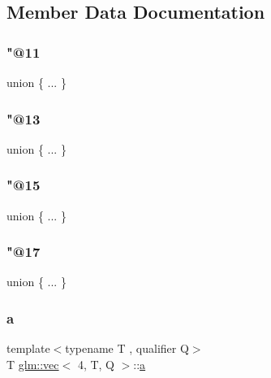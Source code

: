 \subsection{Member Data Documentation}
\mbox{\label{structglm_1_1vec_3_014_00_01_t_00_01_q_01_4_aa890ab635b49abc0ca73ec0a5d5b300d}} 
\subsubsection{\texorpdfstring{"@11}{@11}}
{\footnotesize\ttfamily union \{ ... \} }

\mbox{\label{structglm_1_1vec_3_014_00_01_t_00_01_q_01_4_aa4c6182cce44442db73c5fbd35786723}} 
\subsubsection{\texorpdfstring{"@13}{@13}}
{\footnotesize\ttfamily union \{ ... \} }

\mbox{\label{structglm_1_1vec_3_014_00_01_t_00_01_q_01_4_ace2b88b773cc3bf4381bfc9e8b793afb}} 
\subsubsection{\texorpdfstring{"@15}{@15}}
{\footnotesize\ttfamily union \{ ... \} }

\mbox{\label{structglm_1_1vec_3_014_00_01_t_00_01_q_01_4_afdc8bfb265955425d62d19e8056dd774}} 
\subsubsection{\texorpdfstring{"@17}{@17}}
{\footnotesize\ttfamily union \{ ... \} }

\mbox{\label{structglm_1_1vec_3_014_00_01_t_00_01_q_01_4_a2c591708237bac7d2047ff5af383a012}} 
\subsubsection{\texorpdfstring{a}{a}}
{\footnotesize\ttfamily template$<$typename T , qualifier Q$>$ \\
T \mbox{\hyperlink{structglm_1_1vec}{glm\+::vec}}$<$ 4, T, Q $>$\+::\mbox{\hyperlink{_s_d_l__opengl__glext_8h_a3309789fc188587d666cda5ece79cf82}{a}}}

